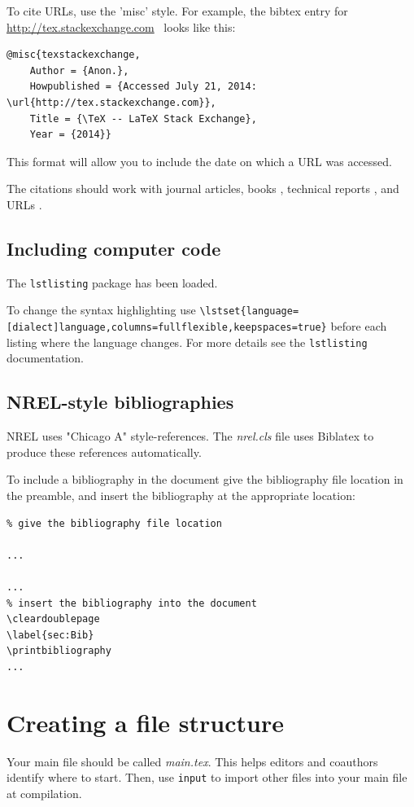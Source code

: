 To cite URLs, use the 'misc' style. For example, the bibtex entry for \href{http://tex.stackexchange.com}{http://tex.stackexchange.com}\ \cite{texstackexchange} looks like this:

\begin{lstlisting}
@misc{texstackexchange,
	Author = {Anon.},
	Howpublished = {Accessed July 21, 2014: \url{http://tex.stackexchange.com}},
	Title = {\TeX -- LaTeX Stack Exchange},
	Year = {2014}}
\end{lstlisting}

This format will allow you to include the date on which a URL was accessed.

The citations should work with journal articles, books \citep{Lamport_1986_a}, technical reports \citep{TechReportTest}, and URLs \citep{texstackexchange}.

\subsection{Including computer code}
The \texttt{lstlisting} package has been loaded. 

To change the syntax highlighting use \verb+\lstset{language=[dialect]language,columns=fullflexible,keepspaces=true}+ before each listing where the language changes. For more details see the \texttt{lstlisting} documentation.

\subsection{NREL-style bibliographies}
NREL uses "Chicago A" style-references. The \emph{nrel.cls} file uses Biblatex to produce these references automatically. 

To include a bibliography in the document give the bibliography file location in the preamble, and insert the bibliography at the appropriate location:

\begin{lstlisting}
% give the bibliography file location

...

...
% insert the bibliography into the document
\cleardoublepage
\label{sec:Bib}
\printbibliography
...

\end{lstlisting}

\section{Creating a file structure}
\label{sec:FileStructure}
Your main file should be called \emph{main.tex}. This helps editors and coauthors identify where to start. Then, use \texttt{input} to import other files into your main file at compilation.

